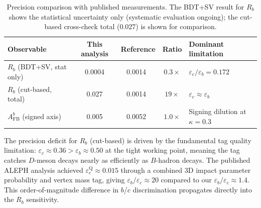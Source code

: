 \documentclass[11pt,a4paper]{article}
\begin{document}
\begin{table}[htbp]
\centering
\caption{Precision comparison with published measurements.
The BDT+SV result for $R_b$ shows the statistical uncertainty only
(systematic evaluation ongoing); the cut-based cross-check total
(0.027) is shown for comparison.}
\label{tbl:precision}
\begin{tabular}{lcccl}
\toprule
Observable & This analysis & Reference & Ratio &
Dominant limitation \\
\midrule
$R_b$ (BDT+SV, stat only) & 0.0004 & 0.0014~\cite{ALEPH:Rb:1996} &
  $0.3\times$ & $\varepsilon_c/\varepsilon_b = 0.172$ \\
$R_b$ (cut-based, total) & 0.027 & 0.0014~\cite{ALEPH:Rb:1996} &
  $19\times$ & $\varepsilon_c \approx \varepsilon_b$ \\
$A_\text{FB}^b$ (signed axis) & 0.005 &
  0.0052~\cite{ALEPH:AFBb} & $1.0\times$ &
  Signing dilution at $\kappa = 0.3$ \\
\bottomrule
\end{tabular}
\end{table}

The precision deficit for $R_b$ (cut-based) is driven by the fundamental
tag quality limitation: $\varepsilon_c \approx 0.36 >
\varepsilon_b \approx 0.50$ at the tight working point, meaning
the tag catches $D$-meson decays nearly as efficiently as
$B$-hadron decays.
The published ALEPH analysis achieved $\varepsilon_c^\text{Q} \approx
0.015$ through a combined 3D impact parameter probability
and vertex mass tag, giving $\varepsilon_b/\varepsilon_c
\approx 20$ compared to our $\varepsilon_b/\varepsilon_c \approx
1.4$.
This order-of-magnitude difference in $b$/$c$ discrimination
propagates directly into the $R_b$ sensitivity.
\end{document}

